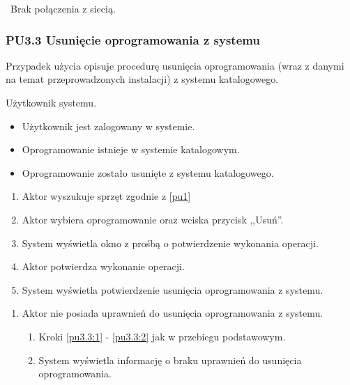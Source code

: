 \
Brak połączenia z siecią.

\subsubsection{PU3.3 Usunięcie oprogramowania z systemu}

Przypadek użycia opisuje procedurę usunięcia oprogramowania (wraz z danymi na temat przeprowadzonych instalacji) z systemu katalogowego.

Użytkownik systemu.

\begin{itemize}
\item Użytkownik jest zalogowany w systemie.
\item Oprogramowanie istnieje w systemie katalogowym.
\end{itemize}

\begin{itemize}
\item Oprogramowanie zostało usunięte z systemu katalogowego.
\end{itemize}

\begin{enumerate}
\item \label{pu3.3:1} Aktor wyszukuje sprzęt zgodnie z \ref{pu1}
\item \label{pu3.3:2} Aktor wybiera oprogramowanie oraz wciska przycisk ,,Usuń''.
\item System wyświetla okno z prośbą o potwierdzenie wykonania operacji.
\item Aktor potwierdza wykonanie operacji.
\item System wyświetla potwierdzenie usunięcia oprogramowania z systemu.
\end{enumerate}

\begin{enumerate}
\item Aktor nie posiada uprawnień do usunięcia oprogramowania z systemu.
	\begin{enumerate}[label*=\arabic*.]
		\item Kroki \ref{pu3.3:1} - \ref{pu3.3:2} jak w przebiegu podstawowym.
		\item System wyświetla informację o braku uprawnień do usunięcia oprogramowania.
	\end{enumerate}
\end{enumerate}

